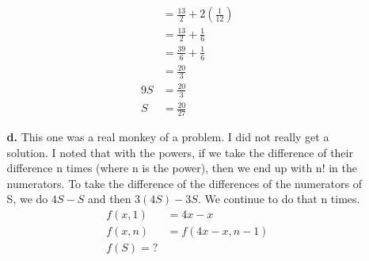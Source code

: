 \documentclass{article}
\begin{document}
\begin{enumerate}
\begin{enumerate}
\begin{align}
              &= \frac{13}{2} + 2(\frac{1}{12}) \\
              &= \frac{13}{2} + \frac{1}{6} \\
              &= \frac{39}{6} + \frac{1}{6} \\
              &= \frac{20}{3} \\
    9S &= \frac{20}{3} \\
    S &= \frac{20}{27}
   \end{align}
  \item[\textbf{d.}]
   This one was a real monkey of a problem. I did not really get a solution. I
   noted that with the powers, if we take the difference of their difference n
   times (where n is the power), then we end up with n! in the numerators. To
   take the difference of the differences of the numerators of S, we do $4S-S$
   and then $3(4S) - 3S$. We continue to do that n times.
   \begin{align}
    f(x,1) &= 4x-x \\
    f(x,n) &= f(4x-x,n-1) \\
    f(S) = ?
   \end{align}
 \end{enumerate}


\end{enumerate}
\end{document}
